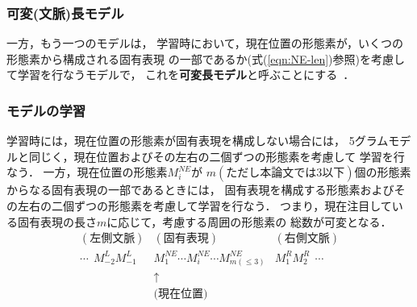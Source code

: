 \subsubsection{可変(文脈)長モデル}
\label{subsubsec:vgram}

一方，もう一つのモデルは，
学習時において，現在位置の形態素が，いくつの形態素から構成される固有表現
の一部であるか(式(\ref{eqn:NE-len})参照)を考慮して学習を行なうモデルで，
これを{\bf 可変長モデル}と呼ぶことにする~\cite{Sassano00bjx,Sassano00a}．

\subsubsection*{モデルの学習}

学習時には，現在位置の形態素が固有表現を構成しない場合には，
5グラムモデルと同じく，現在位置およびその左右の二個ずつの形態素を考慮して
学習を行なう．
一方，現在位置の形態素$M_{i}^{NE}$が
$m(ただし本論文では3以下)$個の形態素からなる固有表現の一部であるときには，
固有表現を構成する形態素およびその左右の二個ずつの形態素を考慮して学習を行なう．
つまり，現在注目している固有表現の長さ$m$に応じて，考慮する周囲の形態素の
総数が可変となる．
\begin{eqnarray*}
(左側文脈) & (固有表現)  & (右側文脈)  \nonumber \\
\cdots\ \  M_{-2}^L M_{-1}^L & 
        M_{1}^{NE}\cdots M_{i}^{NE}\cdots M_{m(\leq 3)}^{NE}
        & M_{1}^R M_{2}^R\ \ \cdots  \nonumber \\ 
        & \uparrow\ \ \ \ \ \ \ & 
				\\ 
        & \mbox{(現在位置)}\ \ \ \ \ \  & \nonumber
\end{eqnarray*}

